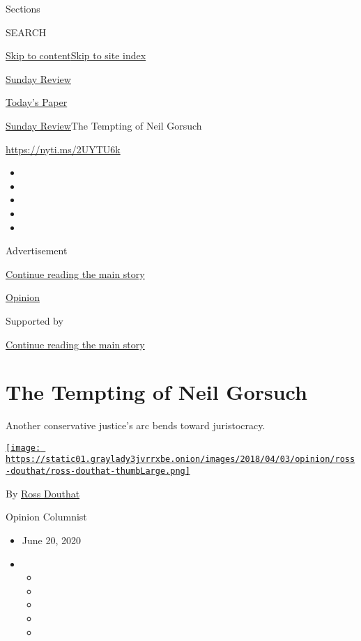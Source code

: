 Sections

SEARCH

\protect\hyperlink{site-content}{Skip to
content}\protect\hyperlink{site-index}{Skip to site index}

\href{https://www.nytimes3xbfgragh.onion/section/opinion/sunday}{Sunday
Review}

\href{https://myaccount.nytimes3xbfgragh.onion/auth/login?response_type=cookie\&client_id=vi}{}

\href{https://www.nytimes3xbfgragh.onion/section/todayspaper}{Today's
Paper}

\href{/section/opinion/sunday}{Sunday Review}\textbar{}The Tempting of
Neil Gorsuch

\url{https://nyti.ms/2UYTU6k}

\begin{itemize}
\item
\item
\item
\item
\item
\end{itemize}

Advertisement

\protect\hyperlink{after-top}{Continue reading the main story}

\href{/section/opinion}{Opinion}

Supported by

\protect\hyperlink{after-sponsor}{Continue reading the main story}

\hypertarget{the-tempting-of-neil-gorsuch}{%
\section{The Tempting of Neil
Gorsuch}\label{the-tempting-of-neil-gorsuch}}

Another conservative justice's arc bends toward juristocracy.

\href{https://www.nytimes3xbfgragh.onion/by/ross-douthat}{\texttt{[image: https://static01.graylady3jvrrxbe.onion/images/2018/04/03/opinion/ross-douthat/ross-douthat-thumbLarge.png]}}

By \href{https://www.nytimes3xbfgragh.onion/by/ross-douthat}{Ross
Douthat}

Opinion Columnist

\begin{itemize}
\item
  June 20, 2020
\item
  \begin{itemize}
  \item
  \item
  \item
  \item
  \item
  \end{itemize}
\end{itemize}

